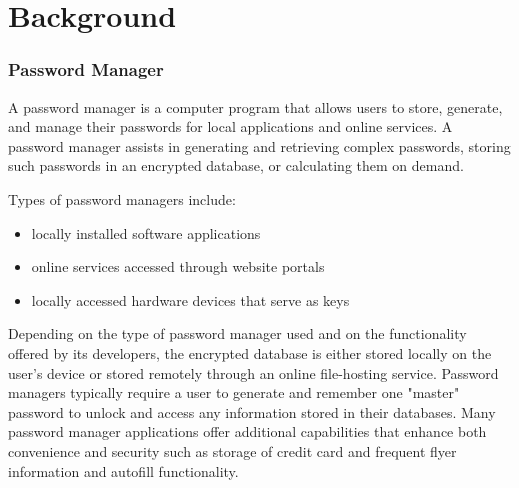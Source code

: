 \chapter{Background}

\subsection*{Password Manager}

A password manager is a computer program that allows users to store, generate, and manage their passwords for local applications and online services.
A password manager assists in generating and retrieving complex passwords, storing such passwords in an encrypted database, or calculating them on demand.

Types of password managers include:

\begin{itemize}
    \item locally installed software applications
    \item online services accessed through website portals
    \item locally accessed hardware devices that serve as keys
\end{itemize}

Depending on the type of password manager used and on the functionality offered by its developers, the encrypted database is either stored locally on the user's device or stored remotely through an online file-hosting service. Password managers typically require a user to generate and remember one "master" password to unlock and access any information stored in their databases. Many password manager applications offer additional capabilities that enhance both convenience and security such as storage of credit card and frequent flyer information and autofill functionality.

